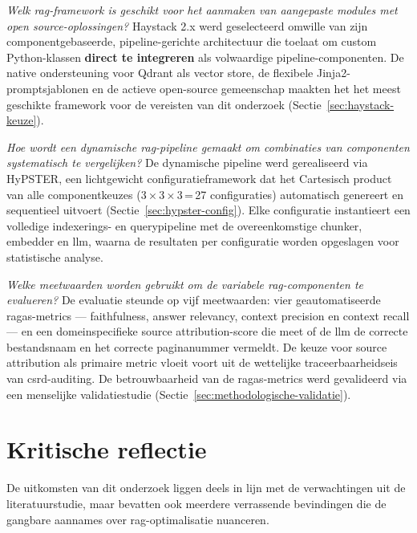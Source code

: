 \textit{Welk \gls{rag}-framework is geschikt voor het aanmaken van aangepaste modules met open source-oplossingen?}
Haystack 2.x werd geselecteerd omwille van zijn componentgebaseerde, pipeline-gerichte architectuur die toelaat om custom Python-klassen \textbf{direct te integreren} als volwaardige pipeline-componenten. De native ondersteuning voor Qdrant als vector store, de flexibele Jinja2-promptsjablonen en de actieve open-source gemeenschap maakten het het meest geschikte framework voor de vereisten van dit onderzoek (Sectie~\ref{sec:haystack-keuze}).

\textit{Hoe wordt een dynamische \gls{rag}-pipeline gemaakt om combinaties van componenten systematisch te vergelijken?}
De dynamische pipeline werd gerealiseerd via HyPSTER, een lichtgewicht configuratieframework dat het Cartesisch product van alle componentkeuzes (3\,×\,3\,×\,3\,=\,27 configuraties) automatisch genereert en sequentieel uitvoert (Sectie~\ref{sec:hypster-config}). Elke configuratie instantieert een volledige indexerings- en querypipeline met de overeenkomstige chunker, embedder en \gls{llm}, waarna de resultaten per configuratie worden opgeslagen voor statistische analyse.

\textit{Welke meetwaarden worden gebruikt om de variabele \gls{rag}-componenten te evalueren?}
De evaluatie steunde op vijf meetwaarden: vier geautomatiseerde \gls{ragas}-metrics — faithfulness, answer relevancy, context precision en context recall — en een domeinspecifieke source attribution-score die meet of de \gls{llm} de correcte bestandsnaam en het correcte paginanummer vermeldt. De keuze voor source attribution als primaire metric vloeit voort uit de wettelijke traceerbaarheidseis van \gls{csrd}-auditing. De betrouwbaarheid van de \gls{ragas}-metrics werd gevalideerd via een menselijke validatiestudie (Sectie~\ref{sec:methodologische-validatie}).

\section{Kritische reflectie}
\label{sec:kritische-reflectie}

De uitkomsten van dit onderzoek liggen deels in lijn met de verwachtingen uit de literatuurstudie, maar bevatten ook meerdere verrassende bevindingen die de gangbare aannames over \gls{rag}-optimalisatie nuanceren.

